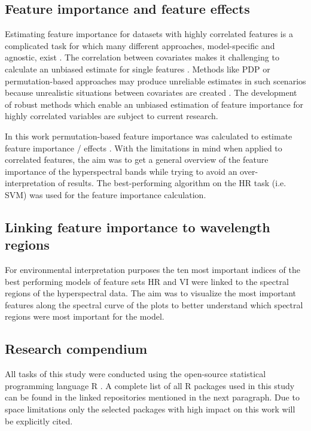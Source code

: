 \documentclass[remotesensing,article,submit,moreauthors,pdftex]{Definitions/mdpi}
\begin{document}
\subsection{Feature importance and feature effects}

Estimating feature importance for datasets with highly correlated features is a complicated task for which many different approaches, model-specific and agnostic, exist \cite{friedman2001, hastie2001, greenwell2018}.
The correlation between covariates makes it challenging to calculate an unbiased estimate for single features \cite{molnar2019}.
Methods like \ac{PDP} or permutation-based approaches may produce unreliable estimates in such scenarios because unrealistic situations between covariates are created \cite{molnar2019}.
The development of robust methods which enable an unbiased estimation of feature importance for highly correlated variables are subject to current research.

In this work permutation-based feature importance was calculated to estimate feature importance / effects \cite{apley2019}.
With the limitations in mind when applied to correlated features, the aim was to get a general overview of the feature importance of the hyperspectral bands while trying to avoid an over-interpretation of results.
The best-performing algorithm on the HR task (i.e. SVM) was used for the feature importance calculation.

\subsection{Linking feature importance to wavelength regions}

For environmental interpretation purposes the ten most important indices of the best performing models of feature sets HR and VI were linked to the spectral regions of the hyperspectral data.
The aim was to visualize the most important features along the spectral curve of the plots to better understand which spectral regions were most important for the model.

\subsection{Research compendium}

All tasks of this study were conducted using the open-source statistical programming language R \cite{rcoreteam2019}.
A complete list of all R packages used in this study can be found in the linked repositories mentioned in the next paragraph.
Due to space limitations only the selected packages with high impact on this work will be explicitly cited.
\end{document}
